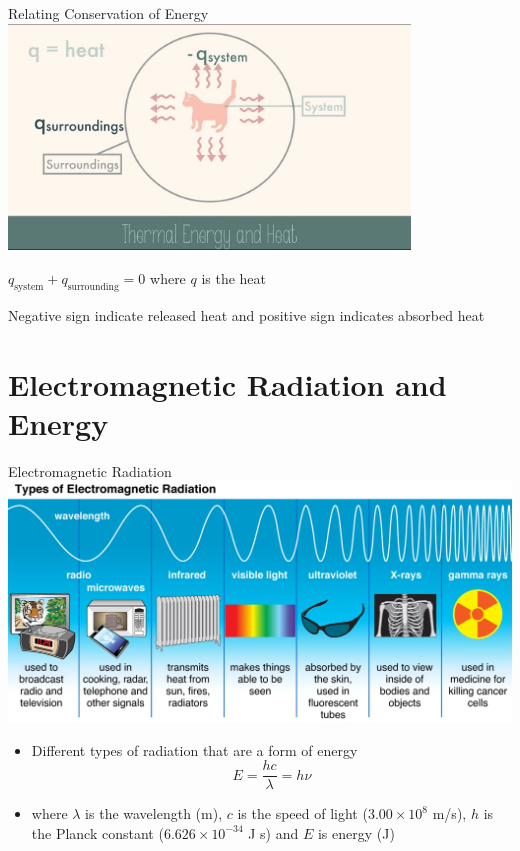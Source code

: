 \documentclass[11pt]{beamer}
\begin{document}
\begin{frame}{Relating Conservation of Energy}
  \centering
  \includegraphics[width=0.8\textwidth]{heat_sys}

  $q_\text{system} + q_\text{surrounding} = 0$
  where $q$ is the heat

  Negative sign indicate released heat and positive sign indicates
  absorbed heat
\end{frame}

\section{Electromagnetic Radiation and Energy}

\begin{frame}{Electromagnetic Radiation}
  \centering
  \includegraphics[width=0.8\linewidth]{electromag_types}

  \begin{itemize}
  \item Different types of radiation that are a form of energy
  \begin{equation}
    E = \frac{hc}{\lambda} = h\nu
  \end{equation}
  \item[] where $\lambda$ is the wavelength (m), $c$ is the speed
    of light ($3.00 \times 10^8$ m/s), $h$ is the Planck constant
    ($6.626 \times 10^{-34}$ J s) and $E$ is energy (J)
  \end{itemize}
\end{frame}
\end{document}
